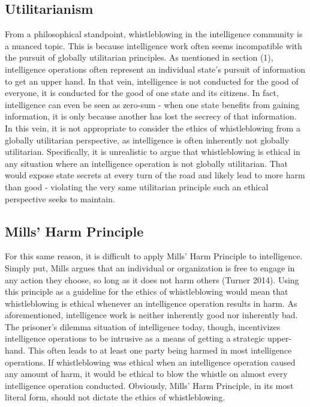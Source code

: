 \documentclass [12 pt] {article}
\begin{document}
\subsection {Utilitarianism}
From a philosophical standpoint, whistleblowing in the intelligence community is a nuanced topic. This is because intelligence work often seems incompatible with the pursuit of globally utilitarian principles. As mentioned in section (1), intelligence operations often represent an individual state's pursuit of information to get an upper hand. In that vein, intelligence is not conducted for the good of everyone, it is conducted for the good of one state and its citizens. In fact, intelligence can even be seen as zero-sum - when one state benefits from gaining information, it is only because another has lost the secrecy of that information. In this vein, it is not appropriate to consider the ethics of whistleblowing from a globally utilitarian perspective, as intelligence is often inherently not globally utilitarian. Specifically, it is unrealistic to argue that whistleblowing is ethical in any situation where an intelligence operation is not globally utilitarian. That would expose state secrets at every turn of the road and likely lead to more harm than good - violating the very same utilitarian principle such an ethical perspective seeks to maintain.
\subsection{Mills' Harm Principle}
For this same reason, it is difficult to apply Mills' Harm Principle to intelligence. Simply put, Mills argues that an individual or organization is free to engage in any action they choose, so long as it does not harm others (Turner 2014). Using this principle as a guideline for the ethics of whistleblowing would mean that whistleblowing is ethical whenever an intelligence operation results in harm. As aforementioned, intelligence work is neither inherently good nor inherently bad. The prisoner's dilemma situation of intelligence today, though, incentivizes intelligence operations to be intrusive as a means of getting a strategic upper-hand. This often leads to at least one party being harmed in most intelligence operations. If whistleblowing was ethical when an intelligence operation caused any amount of harm, it would be ethical to blow the whistle on almost every intelligence operation conducted. Obviously, Mills' Harm Principle, in its most literal form, should not dictate the ethics of whistleblowing.
\end{document}
